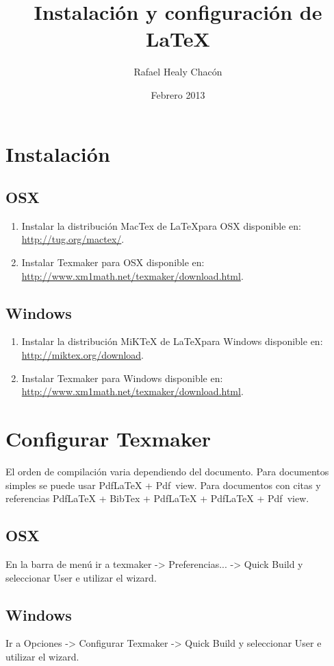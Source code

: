\documentclass[12pt, a4paper]{article}
\title{Instalación y configuración de \LaTeX}
\author{Rafael Healy Chacón}
\date{Febrero 2013}
\begin{document}
\maketitle

\section{Instalación}
\subsection{OSX}
\begin{enumerate}
\item Instalar la distribución MacTex de \LaTeX para OSX disponible en: \url{http://tug.org/mactex/}.
\item Instalar Texmaker para OSX disponible en: \url{http://www.xm1math.net/texmaker/download.html}.
\end{enumerate}

\subsection{Windows}
\begin{enumerate}
\item Instalar la distribución MiKTeX de \LaTeX para Windows disponible en: \url{http://miktex.org/download}.
\item Instalar Texmaker para Windows disponible en: \url{http://www.xm1math.net/texmaker/download.html}.
\end{enumerate}

\section{Configurar Texmaker}

El orden de compilación varia dependiendo del documento. Para documentos simples se puede usar PdfLaTeX + Pdf~view. Para documentos con citas y referencias PdfLaTeX + BibTex + PdfLaTeX + PdfLaTeX + Pdf~view.

\subsection{OSX}
En la barra de menú ir a texmaker -> Preferencias... -> Quick Build y seleccionar User e utilizar el wizard.

\subsection{Windows}
Ir a Opciones -> Configurar Texmaker -> Quick Build y seleccionar User e utilizar el wizard.
\end{document}
